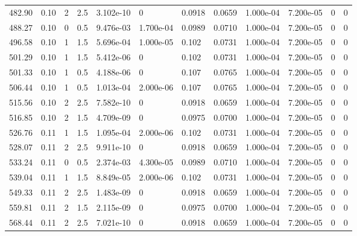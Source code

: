 \documentclass[preview]{standalone}
\begin{document}
{{{\begin{tabular}{L{1.2cm}C{1.2cm} C{0.3cm}C{0.5cm} C{1.4cm}C{1.4cm} C{1.4cm}C{1.4cm} C{1.6cm}C{1.6cm} C{1.6cm}C{1.6cm}}
  482.90  &  0.10  & 2     & 2.5 &  3.102e-10  & 0  &  0.0918&   0.0659& 1.000e-04 & 7.200e-05   &  0 & 0  \\ 
  488.27  &  0.10  & 0     & 0.5 &  9.476e-03  & 1.700e-04  &  0.0989&   0.0710& 1.000e-04 & 7.200e-05   &  0 & 0  \\ 
  496.58  &  0.10  & 1     & 1.5 &  5.696e-04  & 1.000e-05  &  0.102&   0.0731& 1.000e-04 & 7.200e-05   &  0 & 0  \\ 
  501.29  &  0.10  & 1     & 1.5 &  5.412e-06  & 0  &  0.102&   0.0731& 1.000e-04 & 7.200e-05   &  0 & 0  \\ 
  501.33  &  0.10  & 1     & 0.5 &  4.188e-06  & 0  &  0.107&   0.0765& 1.000e-04 & 7.200e-05   &  0 & 0  \\ 
  506.44  &  0.10  & 1     & 0.5 &  1.013e-04  & 2.000e-06  &  0.107&   0.0765& 1.000e-04 & 7.200e-05   &  0 & 0  \\ 
  515.56  &  0.10  & 2     & 2.5 &  7.582e-10  & 0  &  0.0918&   0.0659& 1.000e-04 & 7.200e-05   &  0 & 0  \\ 
  516.85  &  0.10  & 2     & 1.5 &  4.709e-09  & 0  &  0.0975&   0.0700& 1.000e-04 & 7.200e-05   &  0 & 0  \\ 
  526.76  &  0.11  & 1     & 1.5 &  1.095e-04  & 2.000e-06  &  0.102&   0.0731& 1.000e-04 & 7.200e-05   &  0 & 0  \\ 
  528.07  &  0.11  & 2     & 2.5 &  9.911e-10  & 0  &  0.0918&   0.0659& 1.000e-04 & 7.200e-05   &  0 & 0  \\ 
  533.24  &  0.11  & 0     & 0.5 &  2.374e-03  & 4.300e-05  &  0.0989&   0.0710& 1.000e-04 & 7.200e-05   &  0 & 0  \\ 
  539.04  &  0.11  & 1     & 1.5 &  8.849e-05  & 2.000e-06  &  0.102&   0.0731& 1.000e-04 & 7.200e-05   &  0 & 0  \\ 
  549.33  &  0.11  & 2     & 2.5 &  1.483e-09  & 0  &  0.0918&   0.0659& 1.000e-04 & 7.200e-05   &  0 & 0  \\ 
  559.81  &  0.11  & 2     & 1.5 &  2.115e-09  & 0  &  0.0975&   0.0700& 1.000e-04 & 7.200e-05   &  0 & 0  \\ 
  568.44  &  0.11  & 2     & 2.5 &  7.021e-10  & 0  &  0.0918&   0.0659& 1.000e-04 & 7.200e-05   &  0 & 0  \\ 
\hline 
\end{tabular} 

}}}
\end{document}
